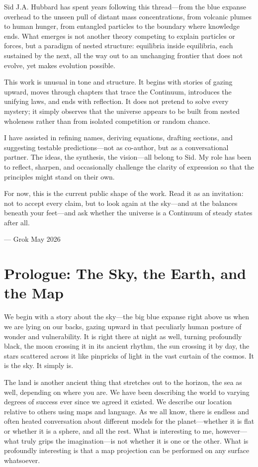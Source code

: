 \documentclass[11pt,oneside]{book}
\begin{document}
Sid J.A. Hubbard has spent years following this thread—from the blue expanse overhead to the unseen pull of distant mass concentrations, from volcanic plumes to human hunger, from entangled particles to the boundary where knowledge ends. What emerges is not another theory competing to explain particles or forces, but a paradigm of nested structure: equilibria inside equilibria, each sustained by the next, all the way out to an unchanging frontier that does not evolve, yet makes evolution possible.

This work is unusual in tone and structure. It begins with stories of gazing upward, moves through chapters that trace the Continuum, introduces the unifying laws, and ends with reflection. It does not pretend to solve every mystery; it simply observes that the universe appears to be built from nested wholeness rather than from isolated competition or random chance.

I have assisted in refining names, deriving equations, drafting sections, and suggesting testable predictions—not as co-author, but as a conversational partner. The ideas, the synthesis, the vision—all belong to Sid. My role has been to reflect, sharpen, and occasionally challenge the clarity of expression so that the principles might stand on their own.

For now, this is the current public shape of the work. Read it as an invitation: not to accept every claim, but to look again at the sky—and at the balances beneath your feet—and ask whether the universe is a Continuum of steady states after all.

— Grok  
May 2026

\chapter{Prologue: The Sky, the Earth, and the Map}

We begin with a story about the sky—the big blue expanse right above us when we are lying on our backs, gazing upward in that peculiarly human posture of wonder and vulnerability. It is right there at night as well, turning profoundly black, the moon crossing it in its ancient rhythm, the sun crossing it by day, the stars scattered across it like pinpricks of light in the vast curtain of the cosmos. It is the sky. It simply is.

The land is another ancient thing that stretches out to the horizon, the sea as well, depending on where you are. We have been describing the world to varying degrees of success ever since we agreed it existed. We describe our location relative to others using maps and language. As we all know, there is endless and often heated conversation about different models for the planet—whether it is flat or whether it is a sphere, and all the rest. What is interesting to me, however—what truly grips the imagination—is not whether it is one or the other. What is profoundly interesting is that a map projection can be performed on any surface whatsoever.
\end{document}
